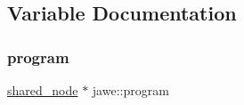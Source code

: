 \subsection{Variable Documentation}
\mbox{\label{namespacejawe_a234b0950c04caa89716a7592140fda5b}} 
\subsubsection{\texorpdfstring{program}{program}}
{\footnotesize\ttfamily \hyperlink{namespacejawe_a3f307481d921b6cbb50cc8511fc2b544}{shared\+\_\+node} $\ast$ jawe\+::program}

